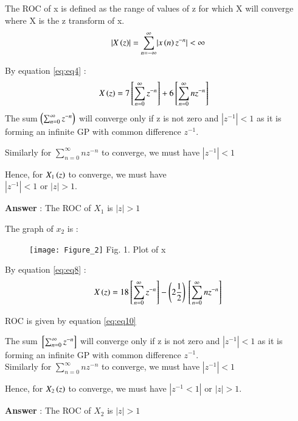 \documentclass[journal,12pt,twocolumn]{IEEEtran}
\theoremstyle{remark}
\begin{document}
The ROC of x is defined as the range of values of z for which X will converge where X is the z transform of x.\\
\begin{align}\label{eq:eq10}
   \lvert X\left(z\right)\rvert = \sum_{n = -\infty}^{\infty}\lvert x\left(n\right)z^{-n}\rvert < \infty
\end{align}

By equation \eqref{eq:eq4} :\\
\begin{align}
X\left(z\right) &=  7{}\left[\sum_{n=0}^{\infty}z^{-n}\right] + 6{}\left[\sum_{n=0}^{\infty}nz^{-n}\right] \label{eq:eq7}
\end{align}
The sum $ \left(\sum_{n=0}^{\infty}z^{-n}\right) $ will converge only if z is not zero and $ |z^{-1}|< 1 $ as it is forming an infinite GP with common difference $z^{-1}$. 

Similarly for $\sum_{n=0}^{\infty}nz^{-n}$ to converge, we must have $|z^{-1}| < 1$

Hence, for $X_{1}\left(z\right)$ to converge, we must have \\ $|z^{-1}| < 1$ or $|z| > 1$.

\large\textbf{Answer} : \normalsize The ROC of $X_{1}$ is  $\lvert z \rvert > 1$

\vspace{4mm}

\large\textbf{} \normalsize The graph of $x_{2}$ is :

\vspace{4mm}

\begin{figure}[!ht]
    \begin{center}
    \texttt{[image: Figure\_2]}
    Fig. 1. Plot of x \\
    \end{center}
\end{figure}

\FloatBarrier


By equation \eqref{eq:eq8} :\\
\begin{align}
X\left(z\right) = 18{}\left[\sum_{n=0}^{\infty}z^{-n}\right] - \left(2\frac{1}{2}\right){}\left[\sum_{n=0}^{\infty}nz^{-n}\right] \label{eq:eq9}
\end{align}

ROC is given by equation \eqref{eq:eq10}

The sum $ {}\left[\sum_{n=0}^{\infty}z^{-n}\right]$ will converge only if z is not zero and $\left|z^{-1}\right| < 1$ as it is forming an infinite GP with common difference $z^{-1}$.\\

Similarly for $\sum_{n=0}^{\infty}nz^{-n}$ to converge, we must have $|z^{-1}| < 1$

Hence, for $X_{2}\left(z\right)$ to converge, we must have $|z^{-1} < 1|$ or $|z| > 1$.

\vspace{4mm}

\large\textbf{Answer} : \normalsize The ROC of $X_{2}$ is  $|z| > 1$
\end{document}
